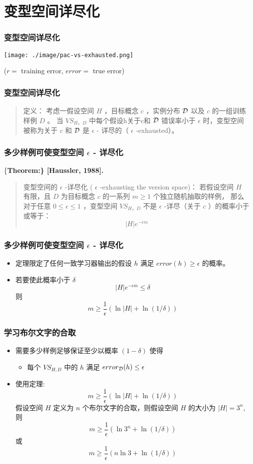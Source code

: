 \documentclass{beamer}
\begin{document}
\section{变型空间详尽化}
\label{sec-4}
\begin{frame}
\frametitle{变型空间详尽化}
\label{sec-4-1}

\texttt{[image: ./image/pac-vs-exhausted.png]}
\centerline{($r =$ training error, $error = $ true error)}
\end{frame}
\begin{frame}
\frametitle{变型空间详尽化}
\label{sec-4-2}

\begin{quote}
定义： 考虑一假设空间 $H$ ，目标概念 $c$ ，实例分布 $\cal{D}$ 以及 $c$ 的一组训练样例 $D$ 。
当 $VS_{H，D}$ 中每个假设h关于c和 $\cal{D}$ 错误率小于 $\epsilon$ 时，变型空间被称为关于 $c$ 和 $\cal{D}$ 是 $\epsilon$ - 详尽的（ $\epsilon$ -exhausted）。
\end{quote}
\end{frame}
\begin{frame}
\frametitle{多少样例可使变型空间  $\epsilon$ - 详尽化}
\label{sec-4-3}


\{\bf Theorem:\} [Haussler, 1988].
\begin{quote}
变型空间的 $\epsilon$ -详尽化 ( $\epsilon$ -exhausting the version space)： 若假设空间 $H$ 有限，且 $D$ 为目标概念 $c$ 的一系列 $m\geq 1$ 个独立随机抽取的样例，
那么对于任意 $0 \leq\epsilon \leq 1$ ，变型空间 $VS_{H，D}$ 不是 $\epsilon$ -详尽（关于 $c$ ）的概率小于或等于：
$$|H|e^{-\epsilon m}$$
\end{quote}
\end{frame}
\begin{frame}
\frametitle{多少样例可使变型空间  $\epsilon$ - 详尽化}
\label{sec-4-4}

\begin{itemize}
\item 定理限定了任何一致学习器输出的假设 $h$ 满足 $error(h) \geq \epsilon$ 的概率。
\item 若要使此概率小于 $\delta$
  $$|H|e^{- \epsilon m} \leq \delta$$
  则
  $$m \geq \frac{1}{\epsilon}(\ln|H| + \ln(1/\delta))$$
\end{itemize}
\end{frame}
\begin{frame}
\frametitle{学习布尔文字的合取}
\label{sec-4-5}


\begin{itemize}
\item 需要多少样例足够保证至少以概率 $(1 - \delta)$ 使得
\begin{itemize}
\item 每个 $VS_{H,D}$ 中的 $h$ 满足 $error_{\cal D}(h) \leq \epsilon$
\end{itemize}
\item 使用定理:
 $$m \geq \frac{1}{\epsilon}(\ln|H| + \ln(1/\delta))$$
 假设空间 $H$ 定义为 $n$ 个布尔文字的合取，则假设空间 $H$ 的大小为 $|H| = 3^n$, 则
 $$m \geq \frac{1}{\epsilon}(\ln 3^n + \ln(1/\delta))$$
 或
 $$m \geq \frac{1}{\epsilon}(n \ln 3 + \ln(1/\delta))$$
\end{itemize}
\end{frame}
\end{document}
